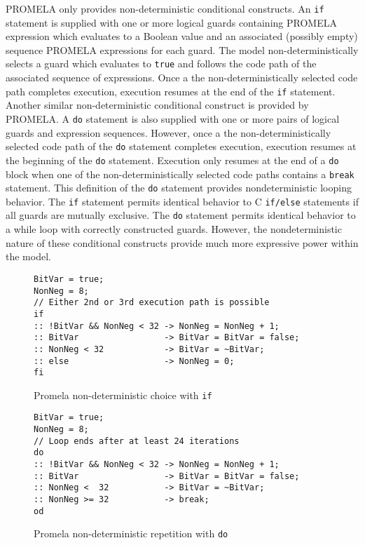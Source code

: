 PROMELA only provides non-deterministic conditional constructs.
An \texttt{if} statement is supplied with one or more logical guards containing PROMELA expression which evaluates to a Boolean value and an associated (possibly empty) sequence PROMELA expressions for each guard.
The model non-deterministically selects a guard which evaluates to \texttt{true} and follows the code path of the associated sequence of expressions.
Once a the non-deterministically selected code path completes execution, execution resumes at the end of the \texttt{if} statement.
Another similar non-deterministic conditional construct is provided by PROMELA.
A \texttt{do} statement is also supplied with one or more pairs of logical guards and expression sequences.
However, once a the non-deterministically selected code path of the \texttt{do} statement completes execution, execution resumes at the beginning of the \texttt{do} statement.
Execution only resumes at the end of a \texttt{do} block when one of the non-deterministically selected code paths contains a \texttt{break} statement.
This definition of the \texttt{do} statement provides nondeterministic looping behavior.
The \texttt{if} statement permits identical behavior to C \texttt{if/else} statements if all guards are mutually exclusive.
The \texttt{do} statement permits identical behavior to a while loop with correctly constructed guards.
However, the nondeterministic nature of these conditional constructs provide much more expressive power within the model.

\begin{figure}
\centering
\caption{Promela non-deterministic choice with \texttt{if}}
\begin{verbatim}
BitVar = true;
NonNeg = 8;
// Either 2nd or 3rd execution path is possible
if
:: !BitVar && NonNeg < 32 -> NonNeg = NonNeg + 1;
:: BitVar                 -> BitVar = BitVar = false;
:: NonNeg < 32            -> BitVar = ~BitVar;
:: else                   -> NonNeg = 0;
fi
\end{verbatim}
\end{figure}

\begin{figure}
\centering
\caption{Promela non-deterministic repetition with \texttt{do}}
\begin{verbatim}
BitVar = true;
NonNeg = 8;
// Loop ends after at least 24 iterations
do
:: !BitVar && NonNeg < 32 -> NonNeg = NonNeg + 1;
:: BitVar                 -> BitVar = BitVar = false;
:: NonNeg <  32           -> BitVar = ~BitVar;
:: NonNeg >= 32           -> break;
od
\end{verbatim}
\end{figure}

